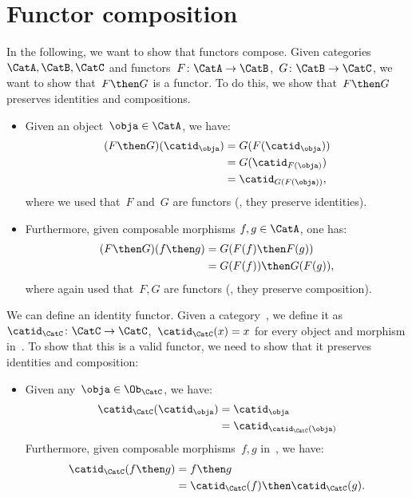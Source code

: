 

\section{Functor composition}


In the following, we want to show that functors compose.
Given categories~$\CatA,\CatB,\CatC$ and functors~$F\colon \CatA\to \CatB$,~$G\colon \CatB\to \CatC$, we want to show that~$F\then G$ is a functor. To do this, we show that~$F\then G$ preserves identities and compositions.
\begin{itemize}
  \item Given an object~$\obja\in \CatA$, we have:
  \begin{equation*}
    \begin{aligned}
    (F\then G)(\catid_\obja)
      &=G(F(\catid_\obja))\\
      &=G(\catid_{F(\obja)})\\
      &=\catid_{G(F(\obja))},
    \end{aligned}
  \end{equation*}
  where we used that~$F$ and~$G$ are functors (\ie , they preserve identities).
  \item Furthermore, given composable morphisms $f,g\in \CatA$, one has:
  \begin{equation*}
    \begin{aligned}
    (F\then G)(f\then g)
      &=G(F(f)\then F(g))\\
      &=G(F(f))\then G(F(g)),
    \end{aligned}
  \end{equation*}
  where again used that~$F,G$ are functors (\ie , they preserve composition).
\end{itemize}


We can define an identity functor. Given a category~\CatC, we define it as~$\catid_\CatC\colon \CatC \to \CatC$,~$\catid_\CatC(x)=x$ for every object and morphism in~\CatC. To show that this is a valid functor, we need to show that it preserves identities and composition:
\begin{itemize}
  \item Given any~$\obja \in \Ob_\CatC$, we have:
  \begin{equation*}
    \begin{aligned}
      \catid_\CatC(\catid_\obja)&=\catid_\obja\\
      &=\catid_{\catid_\CatC(\obja)}
    \end{aligned}
  \end{equation*}
  Furthermore, given composable morphisms~$f,g$ in~\CatC, we have:
  \begin{equation*}
    \begin{aligned}
      \catid_{\CatC}(f\then g)&=f\then g\\
      &=\catid_{\CatC}(f)\then \catid_{\CatC} (g).
    \end{aligned}
  \end{equation*}
\end{itemize}


